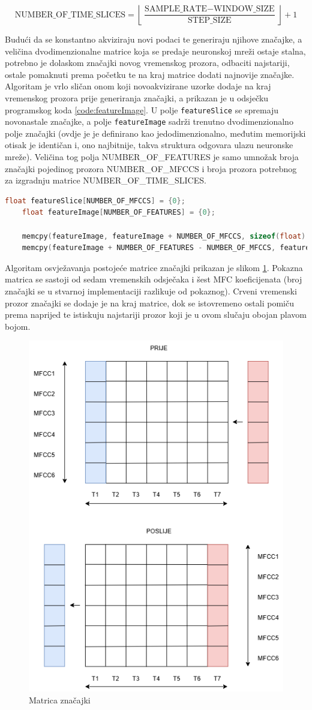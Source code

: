 \begin{equation}
    \label{eq:timeslices}
    \text{NUMBER\_OF\_TIME\_SLICES} = \left\lfloor \frac{\text{SAMPLE\_RATE} - \text{WINDOW\_SIZE}}{\text{STEP\_SIZE}} \right\rfloor + 1
\end{equation}

Budući da se konstantno akviziraju novi podaci te generiraju njihove značajke, a veličina
dvodimenzionalne matrice koja se predaje neuronskoj mreži ostaje stalna, potrebno je 
dolaskom značajki novog vremenskog prozora, odbaciti najstariji, ostale pomaknuti prema početku
te na kraj matrice dodati najnovije značajke. Algoritam je vrlo sličan onom koji novoakvizirane
uzorke dodaje na kraj vremenskog prozora prije generiranja značajki, a prikazan je u odsječku
programskog koda \ref{code:featureImage}. U polje \texttt{featureSlice} se spremaju novonastale
značajke, a polje \texttt{featureImage} sadrži trenutno dvodimenzionalno polje značajki (ovdje je
je definirano kao jedodimenzionalno, međutim memorijski otisak je identičan i, ono najbitnije,
takva struktura odgovara ulazu neuronske mreže). Veličina tog polja NUMBER\_OF\_FEATURES je samo
umnožak broja značajki pojedinog prozora NUMBER\_OF\_MFCCS i broja prozora potrebnog za 
izgradnju matrice NUMBER\_OF\_TIME\_SLICES.

\begin{lstlisting}[language=C++, caption=Generiranje matrice značajki, label=code:featureImage]
    float featureSlice[NUMBER_OF_MFCCS] = {0};
    float featureImage[NUMBER_OF_FEATURES] = {0};

    memcpy(featureImage, featureImage + NUMBER_OF_MFCCS, sizeof(float) * (NUMBER_OF_FEATURES - NUMBER_OF_MFCCS));
    memcpy(featureImage + NUMBER_OF_FEATURES - NUMBER_OF_MFCCS, featureSlice, sizeof(float) * NUMBER_OF_MFCCS);
\end{lstlisting}

Algoritam osvježavanja postojeće matrice značajki prikazan je slikom \ref{pic:featureImage}. 
Pokazna matrica se sastoji od sedam vremenskih odsječaka i šest MFC koeficijenata
(broj značajki se u stvarnoj implementaciji razlikuje od pokaznog). Crveni 
vremenski prozor značajki se dodaje je na kraj matrice, dok se istovremeno ostali pomiču prema
naprijed te istiskuju najstariji prozor koji je u ovom slučaju obojan plavom bojom.

\begin{figure}[htb]
    \centering
    \includegraphics[width=0.4\linewidth]{Chapters/struktura_sustava/generiranje_znacajki/featureImage.png} 
    \caption{Matrica značajki \cite{flowchart}}
    \label{pic:featureImage}
\end{figure}
